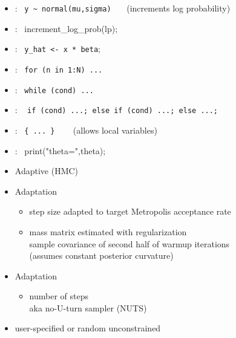 \documentclass[10pt]{report}
\newcommand{\sld}[1]{\newpage{\noindent\LARGE \ \ \
    \textcolor{MidnightBlue}{\bfseries #1}}\vspace*{4pt}}
\newcommand{\code}[1]{{\tt #1}}
\newcommand{\myemph}[1]{{\color{MidnightBlue}{\bfseries #1}}}
\begin{document}
\sld{Statements}

\begin{itemize}
\item \myemph{Sampling}: \ {\footnotesize \Verb|y ~ normal(mu,sigma)|}
  \ \ \ {\footnotesize (increments log probability)}
\item \myemph{Log probability}: \ {\footnotesize increment\_log\_prob(lp);}
\item \myemph{Assignment}: \  {\footnotesize \code{y\_hat <- x * beta};}
\item \myemph{For loop}: \ {\footnotesize \code{for (n in 1:N) ...}}
\item \myemph{While loop}: \ {\footnotesize \code{while (cond) ...}}
\item \myemph{Conditional}: \ {\footnotesize
    \code{if (cond) ...; else if (cond) ...;  else ...;}}
\item \myemph{Block}: \ {\footnotesize \Verb|{ ... }|}  \ \ \ {\footnotesize
    (allows local variables)}
\item \myemph{Print}: \ {\footnotesize print("theta=",theta);}
\end{itemize}

\sld{Full Bayes with MCMC}

\begin{itemize}
\item Adaptive \myemph{Hamiltonian Monte Carlo} (HMC)
\item Adaptation \myemph{during warmup}
  \vspace*{-4pt}
  \begin{itemize}\small
  \item step size adapted to target Metropolis acceptance rate
  \item mass matrix estimated with regularization
    {\footnotesize
      \\ sample covariance of second half of warmup iterations
      \\ (assumes constant posterior curvature)
    }
  \end{itemize}
\item Adaptation \myemph{during sampling}
  \vspace*{-4pt}
  \begin{itemize}\small
  \item number of steps
    \\
    {\footnotesize aka no-U-turn sampler (NUTS)}
  \end{itemize}
\item \myemph{Initialization} user-specified or random unconstrained
\end{itemize}
\end{document}
